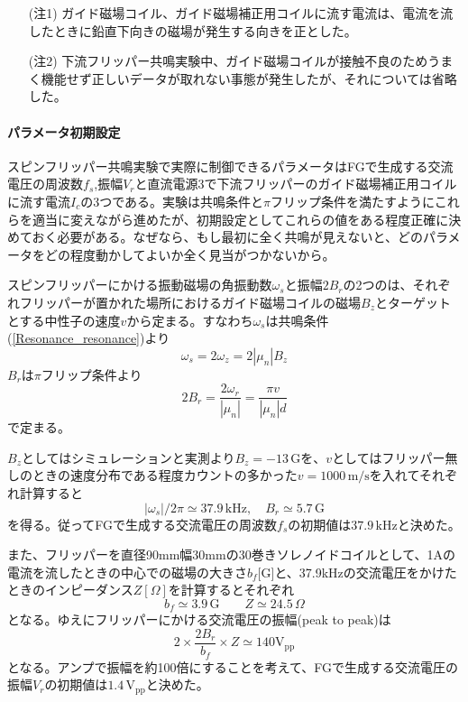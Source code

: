 \begin{itemize}
\item[(注$\!\!$1)] ガイド磁場コイル、ガイド磁場補正用コイルに流す電流は、電流を流したときに鉛直下向きの磁場が発生する向きを正とした。
\item[(注$\!\!$2)] 下流フリッパー共鳴実験中、ガイド磁場コイルが接触不良のためうまく機能せず正しいデータが取れない事態が発生したが、それについては省略した。
\end{itemize}

\paragraph{パラメータ初期設定}
スピンフリッパー共鳴実験で実際に制御できるパラメータはFGで生成する交流電圧の周波数$f_s$,振幅$V_r$と直流電源3で下流フリッパーのガイド磁場補正用コイルに流す電流$I_c$の3つである。実験は共鳴条件と$\pi$フリップ条件を満たすようにこれらを適当に変えながら進めたが、初期設定としてこれらの値をある程度正確に決めておく必要がある。なぜなら、もし最初に全く共鳴が見えないと、どのパラメータをどの程度動かしてよいか全く見当がつかないから。

スピンフリッパーにかける振動磁場の角振動数$\omega_s$と振幅$2B_r$の2つのは、それぞれフリッパーが置かれた場所におけるガイド磁場コイルの磁場$B_z$とターゲットとする中性子の速度$v$から定まる。すなわち$\omega_s$は共鳴条件(\ref{Resonance_resonance})より
\begin{equation}
\omega_s = 2\omega_z =2 |\mu_n|B_z
\end{equation}
$B_r$は$\pi$フリップ条件より
\begin{equation}
2B_r =\frac{2 \omega_r}{|\mu_n|} =\frac{\pi v}{|\mu_n|d}
\end{equation}
で定まる。

$B_z$としてはシミュレーションと実測より$B_z=-13 \, \mathrm{G}$を、$v$としてはフリッパー無しのときの速度分布である程度カウントの多かった$v=1000\, \mathrm{m/s}$を入れてそれぞれ計算すると
\begin{equation}
|\omega_s|/2\pi\simeq 37.9\, \mathrm{kHz}, \quad B_r\simeq 5.7 \, \mathrm{G}
\end{equation}
を得る。従ってFGで生成する交流電圧の周波数$f_s$の初期値は$37.9\,\mathrm{kHz}$と決めた。

また、フリッパーを直径90mm幅30mmの30巻きソレノイドコイルとして、1Aの電流を流したときの中心での磁場の大きさ$b_f$[G]と、37.9kHzの交流電圧をかけたときのインピーダンス$Z[\Omega]$を計算するとそれぞれ
\begin{equation}
b_f\simeq 3.9 \,\mathrm{G} \qquad Z \simeq 24.5 \,\Omega
\end{equation}
となる。ゆえにフリッパーにかける交流電圧の振幅(peak to peak)は
\[2 \times \frac{2B_r}{b_f} \times Z \simeq 140 \mathrm{V_{pp}}\]
となる。アンプで振幅を約100倍にすることを考えて、FGで生成する交流電圧の振幅$V_r$の初期値は$1.4 \,\mathrm{V_{pp}}$と決めた。

